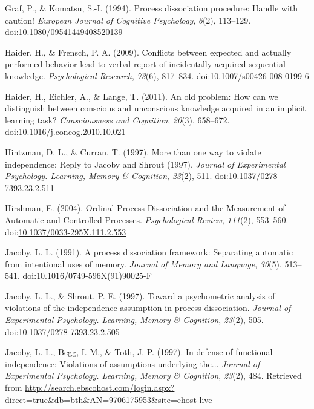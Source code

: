 \documentclass[floatsintext,doc]{apa6}
\theoremstyle{definition}
\theoremstyle{definition}
\theoremstyle{definition}
\theoremstyle{remark}
\begin{document}
\hypertarget{ref-graf_process_1994}{}
Graf, P., \& Komatsu, S.-I. (1994). Process dissociation procedure:
Handle with caution! \emph{European Journal of Cognitive Psychology},
\emph{6}(2), 113--129.
doi:\href{https://doi.org/10.1080/09541449408520139}{10.1080/09541449408520139}

\hypertarget{ref-haider_conflicts_2009}{}
Haider, H., \& Frensch, P. A. (2009). Conflicts between expected and
actually performed behavior lead to verbal report of incidentally
acquired sequential knowledge. \emph{Psychological Research},
\emph{73}(6), 817--834.
doi:\href{https://doi.org/10.1007/s00426-008-0199-6}{10.1007/s00426-008-0199-6}

\hypertarget{ref-haider_old_2011}{}
Haider, H., Eichler, A., \& Lange, T. (2011). An old problem: How can we
distinguish between conscious and unconscious knowledge acquired in an
implicit learning task? \emph{Consciousness and Cognition},
\emph{20}(3), 658--672.
doi:\href{https://doi.org/10.1016/j.concog.2010.10.021}{10.1016/j.concog.2010.10.021}

\hypertarget{ref-hintzman_more_1997}{}
Hintzman, D. L., \& Curran, T. (1997). More than one way to violate
independence: Reply to Jacoby and Shrout (1997). \emph{Journal of
Experimental Psychology. Learning, Memory \& Cognition}, \emph{23}(2),
511.
doi:\href{https://doi.org/10.1037/0278-7393.23.2.511}{10.1037/0278-7393.23.2.511}

\hypertarget{ref-hirshman_ordinal_2004}{}
Hirshman, E. (2004). Ordinal Process Dissociation and the Measurement of
Automatic and Controlled Processes. \emph{Psychological Review},
\emph{111}(2), 553--560.
doi:\href{https://doi.org/10.1037/0033-295X.111.2.553}{10.1037/0033-295X.111.2.553}

\hypertarget{ref-jacoby_process_1991}{}
Jacoby, L. L. (1991). A process dissociation framework: Separating
automatic from intentional uses of memory. \emph{Journal of Memory and
Language}, \emph{30}(5), 513--541.
doi:\href{https://doi.org/10.1016/0749-596X(91)90025-F}{10.1016/0749-596X(91)90025-F}

\hypertarget{ref-jacoby_toward_1997}{}
Jacoby, L. L., \& Shrout, P. E. (1997). Toward a psychometric analysis
of violations of the independence assumption in process dissociation.
\emph{Journal of Experimental Psychology. Learning, Memory \&
Cognition}, \emph{23}(2), 505.
doi:\href{https://doi.org/10.1037/0278-7393.23.2.505}{10.1037/0278-7393.23.2.505}

\hypertarget{ref-jacoby_defense_1997}{}
Jacoby, L. L., Begg, I. M., \& Toth, J. P. (1997). In defense of
functional independence: Violations of assumptions underlying the...
\emph{Journal of Experimental Psychology. Learning, Memory \&
Cognition}, \emph{23}(2), 484. Retrieved from
\url{http://search.ebscohost.com/login.aspx?direct=true\&db=bth\&AN=9706175953\&site=ehost-live}
\end{document}
